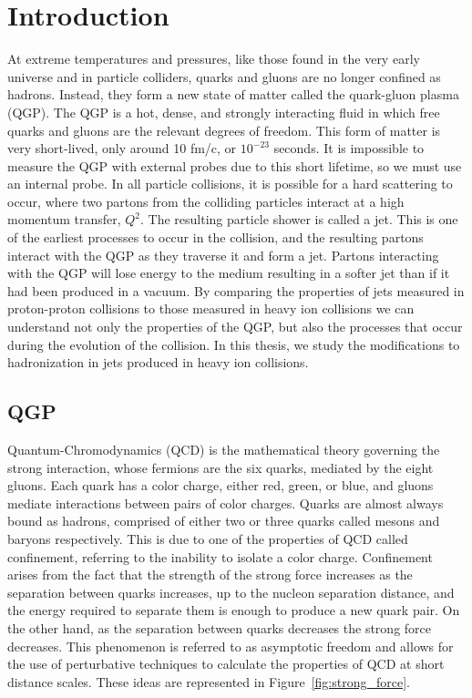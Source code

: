 \chapter{Introduction} \label{ch:introduction}

At extreme temperatures and pressures, like those found in the very early universe and in particle colliders, quarks and gluons are no longer confined as hadrons. Instead, they form a new state of matter called the quark-gluon plasma (QGP). The QGP is a hot, dense, and strongly interacting fluid in which free quarks and gluons are the relevant degrees of freedom. This form of matter is very short-lived, only around 10 fm/c, or $10^{-23}$ seconds. It is impossible to measure the QGP with external probes due to this short lifetime, so we must use an internal probe. In all particle collisions, it is possible for a hard scattering to occur, where two partons from the colliding particles interact at a high momentum transfer, $Q^2$. The resulting particle shower is called a jet. This is one of the earliest processes to occur in the collision, and the resulting partons interact with the QGP as they traverse it and form a jet. Partons interacting with the QGP will lose energy to the medium resulting in a softer jet than if it had been produced in a vacuum. By comparing the properties of jets measured in proton-proton collisions to those measured in heavy ion collisions we can understand not only the properties of the QGP, but also the processes that occur during the evolution of the collision. In this thesis, we study the modifications to hadronization in jets produced in heavy ion collisions.

\section{QGP}

Quantum-Chromodynamics (QCD) is the mathematical theory governing the strong interaction, whose fermions are the six quarks, mediated by the eight gluons. Each quark has a color charge, either red, green, or blue, and gluons mediate interactions between pairs of color charges. Quarks are almost always bound as hadrons, comprised of either two or three quarks called mesons and baryons respectively. This is due to one of the properties of QCD called confinement, referring to the inability to isolate a color charge. Confinement arises from the fact that the strength of the strong force increases as the separation between quarks increases, up to the nucleon separation distance, and the energy required to separate them is enough to produce a new quark pair. On the other hand, as the separation between quarks decreases the strong force decreases. This phenomenon is referred to as asymptotic freedom and allows for the use of perturbative techniques to calculate the properties of QCD at short distance scales. These ideas are represented in Figure~\ref{fig:strong_force}.

